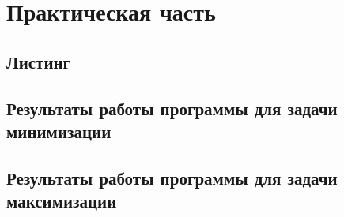 \chapter{Практическая часть}

\section{Листинг}


\newpage

\section{Результаты работы программы для задачи минимизации}


\newpage

\section{Результаты работы программы для задачи максимизации}

